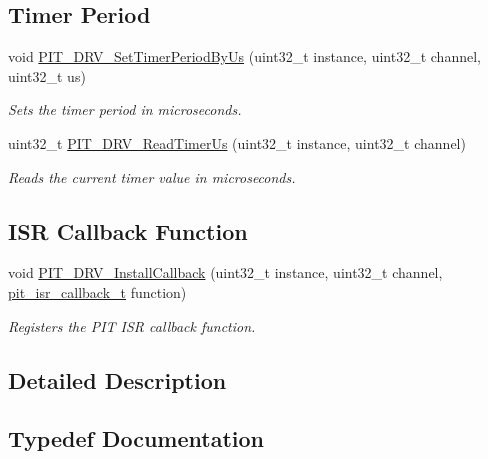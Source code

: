 \subsection*{Timer Period}
\begin{DoxyCompactItemize}
\item 
void \hyperlink{group__pit__driver_ga7b0d9eeb96ae3810c801b9998d5774bf}{P\+I\+T\+\_\+\+D\+R\+V\+\_\+\+Set\+Timer\+Period\+By\+Us} (uint32\+\_\+t instance, uint32\+\_\+t channel, uint32\+\_\+t us)
\begin{DoxyCompactList}\small\item\em Sets the timer period in microseconds. \end{DoxyCompactList}\item 
uint32\+\_\+t \hyperlink{group__pit__driver_ga5ee81b85b0c672604b35855c86967ac7}{P\+I\+T\+\_\+\+D\+R\+V\+\_\+\+Read\+Timer\+Us} (uint32\+\_\+t instance, uint32\+\_\+t channel)
\begin{DoxyCompactList}\small\item\em Reads the current timer value in microseconds. \end{DoxyCompactList}\end{DoxyCompactItemize}
\subsection*{I\+SR Callback Function}
\begin{DoxyCompactItemize}
\item 
void \hyperlink{group__pit__driver_ga1a28c078e3820e920560f56c4e081948}{P\+I\+T\+\_\+\+D\+R\+V\+\_\+\+Install\+Callback} (uint32\+\_\+t instance, uint32\+\_\+t channel, \hyperlink{group__pit__driver_gaa877fbdf0d2c05a13fde6c680d1d6b4d}{pit\+\_\+isr\+\_\+callback\+\_\+t} function)
\begin{DoxyCompactList}\small\item\em Registers the P\+IT I\+SR callback function. \end{DoxyCompactList}\end{DoxyCompactItemize}


\subsection{Detailed Description}


\subsection{Typedef Documentation}
